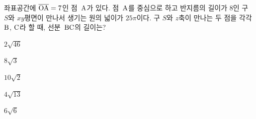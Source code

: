 좌표공간에 $\overline{\mathrm{OA}}=7$인 점~$\mathrm{A}$가 있다. 점~$\mathrm{A}$를 중심으로 하고 반지름의 길이가 $8$인 구 $S$와 $xy$평면이 만나서 생기는 원의 넓이가 $25\pi$이다. 구 $S$와 $z$축이 만나는 두 점을 각각 $\mathrm{B}$, $\mathrm{C}$라 할 때, 선분~$\mathrm{BC}$의 길이는? 
\begin{choices32}{\rule[-3ex]{0pt}{8ex}$2\sqrt{46}$}{\rule[-3ex]{0pt}{8ex}$8\sqrt{3}$}{\rule[-3ex]{0pt}{8ex}$10\sqrt{2}$}{\rule[-3ex]{0pt}{8ex}$4\sqrt{13}$}{\rule[-3ex]{0pt}{8ex}$6\sqrt{6}$}\end{choices32}
